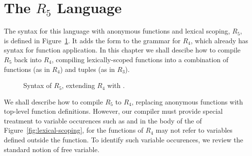 \documentclass[11pt]{book}
\newcommand{\gray}[1]{{\color{lightgray} #1}}
\begin{document}
\section{The $R_5$ Language}

The syntax for this language with anonymous functions and lexical
scoping, $R_5$, is defined in Figure~\ref{fig:r5-syntax}. It adds the
 form to the grammar for $R_4$, which already has syntax
for function application.  In this chapter we shall descibe how to
compile $R_5$ back into $R_4$, compiling lexically-scoped functions
into a combination of functions (as in $R_4$) and tuples (as in
$R_3$).

\begin{figure}[tp]
\centering
\fbox{
\begin{minipage}{0.96\textwidth}
\[
\begin{array}{lcl}
  \Type &::=& \gray{\key{Integer} \mid \key{Boolean}
     \mid (\key{Vector}\;\Type^{+}) \mid \key{Void}
     \mid (\Type^{*} \; \key{->}\; \Type)} \\
  \Exp &::=& \gray{\Int \mid (\key{read}) \mid (\key{-}\;\Exp)
     \mid (\key{+} \; \Exp\;\Exp)}  \\
    &\mid&  \gray{\Var \mid \LET{\Var}{\Exp}{\Exp}
     \mid \key{\#t} \mid \key{\#f} \mid
           (\key{and}\;\Exp\;\Exp) \mid (\key{not}\;\Exp)} \\
    &\mid& \gray{(\key{eq?}\;\Exp\;\Exp) \mid \IF{\Exp}{\Exp}{\Exp}} \\
    &\mid& \gray{(\key{vector}\;\Exp^{+}) \mid
          (\key{vector-ref}\;\Exp\;\Int)} \\
    &\mid& \gray{(\key{vector-set!}\;\Exp\;\Int\;\Exp)\mid (\key{void})} \\
    &\mid& \gray{(\Exp \; \Exp^{*})} \\
    &\mid& (\key{lambda:}\; ([\Var \key{:} \Type]^{*}) \key{:} \Type \; \Exp) \\
  \Def &::=& \gray{(\key{define}\; (\Var \; [\Var \key{:} \Type]^{*}) \key{:} \Type \; \Exp)} \\
  R_5 &::=& \gray{(\key{program} \; \Def^{*} \; \Exp)}
\end{array}
\]
\end{minipage}
}
\caption{Syntax of $R_5$, extending $R_4$ with .}
\label{fig:r5-syntax}
\end{figure}

We shall describe how to compile $R_5$ to $R_4$, replacing anonymous
functions with top-level function definitions.  However, our compiler
must provide special treatment to variable occurences such as 
and  in the body of the  of
Figure~\ref{fig:lexical-scoping}, for the functions of $R_4$ may not
refer to variables defined outside the function. To identify such
variable occurences, we review the standard notion of free variable.
\end{document}
